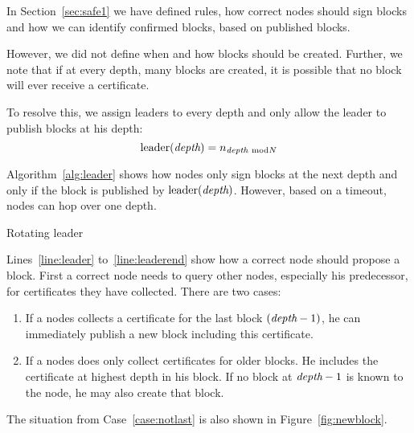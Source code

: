 
\noindent
In Section~\ref{sec:safe1} we have defined rules, how correct nodes should sign blocks and how we can identify confirmed blocks, based on published blocks.

However, we did not define when and how blocks should be created. Further, we note that if at every depth, many blocks are created, it is possible that no block will ever receive a certificate.

To resolve this, we assign leaders to every depth and only allow the leader to publish blocks at his depth:
\[
\textrm{leader}(\textit{depth})=n_{\textit{depth}\ \text{mod} N}
\]

Algorithm~\ref{alg:leader} shows how nodes only sign blocks at the next depth and only if the block is published by $\textrm{leader}(\textit{depth})$.
However, based on a timeout, nodes can hop over one depth.

\begin{algorithm}
	\caption{Rotating leader}
	\label{alg:leader}
	\begin{algorithmic}[1]
			\EndIf
				\State{$\depth++$}
			\EndIf
		\EOn
			\State{$\depth++$}
		\EOn
		\label{line:leader}
			\label{line:wait}
			\EndIf
			\label{line:leaderend}
		\EOn
	\end{algorithmic}
\end{algorithm}	

Lines~\ref{line:leader} to~\ref{line:leaderend} show how a correct node should propose a block. 
First a correct node needs to query other nodes, especially his predecessor, for certificates they have collected.
There are two cases:
\begin{enumerate}[label=\alph*)]
	\item If a nodes collects a certificate for the last block $(\textit{depth}-1)$, he can immediately publish a new block including this certificate.
	\item\label{case:notlast} If a nodes does only collect certificates for older blocks. He includes the certificate at highest depth in his block. If no block at $\textit{depth}-1$ is known to the node, he may also create that block.
\end{enumerate}
The situation from Case~\ref{case:notlast} is also shown in Figure~\ref{fig:newblock}.

